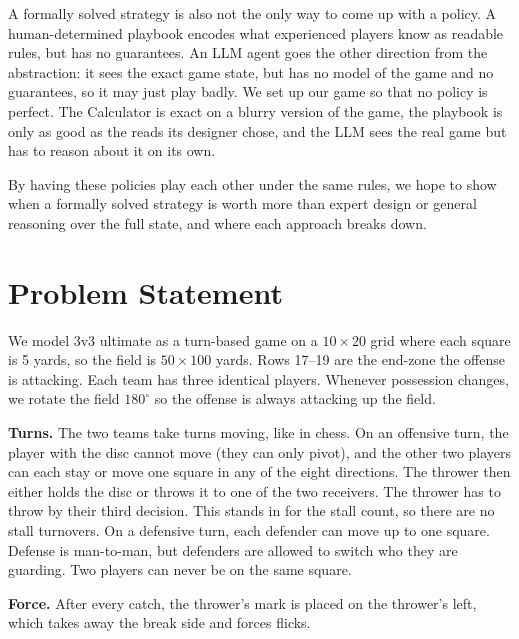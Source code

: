 \documentclass[conference]{IEEEtran}
\begin{document}
A formally solved strategy is also not the only way to come up with a policy. A human-determined playbook encodes what experienced players know as readable rules, but has no guarantees. An LLM agent goes the other direction from the abstraction: it sees the exact game state, but has no model of the game and no guarantees, so it may just play badly. We set up our game so that no policy is perfect. The Calculator is exact on a blurry version of the game, the playbook is only as good as the reads its designer chose, and the LLM sees the real game but has to reason about it on its own.

By having these policies play each other under the same rules, we hope to show when a formally solved strategy is worth more than expert design or general reasoning over the full state, and where each approach breaks down.

\section{Problem Statement}
We model 3v3 ultimate as a turn-based game on a $10\times20$ grid where each square is 5 yards, so the field is $50\times100$ yards. Rows 17--19 are the end-zone the offense is attacking. Each team has three identical players. Whenever possession changes, we rotate the field $180^\circ$ so the offense is always attacking up the field.

\textbf{Turns.} The two teams take turns moving, like in chess. On an offensive turn, the player with the disc cannot move (they can only pivot), and the other two players can each stay or move one square in any of the eight directions. The thrower then either holds the disc or throws it to one of the two receivers. The thrower has to throw by their third decision. This stands in for the stall count, so there are no stall turnovers. On a defensive turn, each defender can move up to one square. Defense is man-to-man, but defenders are allowed to switch who they are guarding. Two players can never be on the same square.

\textbf{Force.} After every catch, the thrower's mark is placed on the thrower's left, which takes away the break side and forces flicks.
\end{document}
